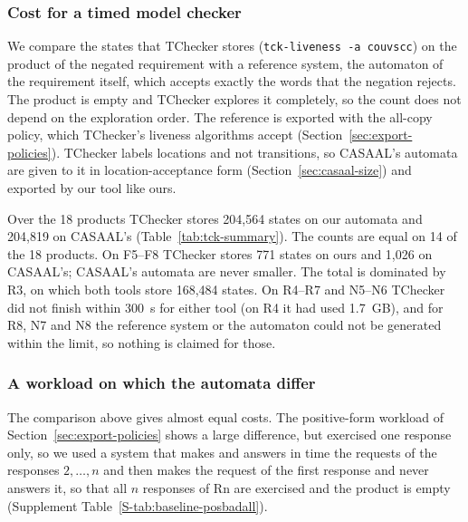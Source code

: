 \subsubsection{Cost for a timed model checker}
\label{sec:casaal-tck}
We compare the states that TChecker stores (\texttt{tck-liveness -a couvscc}) on the product of the negated requirement with a reference system, the automaton of the requirement itself, which accepts exactly the words that the negation rejects. The product is empty and TChecker explores it completely, so the count does not depend on the exploration order.  The reference is exported with the all-copy policy, which TChecker's liveness algorithms accept (Section~\ref{sec:export-policies}). TChecker labels locations and not transitions, so CASAAL's automata are given to it in location-acceptance form (Section~\ref{sec:casaal-size}) and exported by our tool like ours.

\begin{table}[tp]
\centering
\caption{TChecker stored states on the product of the negated requirement with the
reference system, summed over the 18 products on which every variant completed
(F1--F12 with F3b in place of F3, R1--R3, N1--N3; the 20 completed products without F14 and N4), and over three subsets of these products.  ``Invariants removed'' deletes every location invariant. Per-product counts: Supplement Table~\ref{S-tab:casaal-tck}.}
\label{tab:tck-summary}
\small

\end{table}
Over the 18 products TChecker stores 204{,}564 states on our automata and 204{,}819 on
CASAAL's (Table~\ref{tab:tck-summary}). The counts are equal on 14 of the 18 products. On F5--F8
TChecker stores 771 states on ours and 1{,}026 on CASAAL's; CASAAL's automata are never smaller.
  The total is dominated by R3, on which both tools store
168{,}484 states. On R4--R7 and N5--N6 TChecker did not finish within 300~s for either tool (on R4
it had used 1.7~GB), and for R8, N7 and N8 the reference system or the automaton could not
be generated within the limit, so nothing is claimed for those.

\subsubsection{A workload on which the automata differ}
\label{sec:casaal-stress}
The comparison above gives almost equal costs. The positive-form workload of Section~\ref{sec:export-policies} shows a large difference, but exercised one response only, so we used a system that makes and answers in time the requests of the responses $2,\dots,n$ and then makes the request of the first response and never answers it, so that all $n$ responses of Rn are exercised and the product is empty (Supplement Table~\ref{S-tab:baseline-posbadall}).

